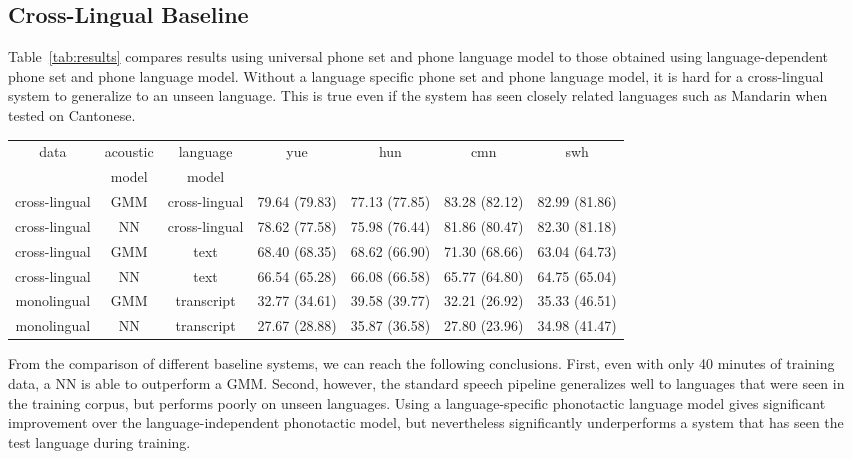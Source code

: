 \subsection{Cross-Lingual Baseline}
\label{s6:mlbaseline}

Table~\ref{tab:results} compares results using universal phone set and
phone language model to those obtained using language-dependent phone
set and phone language model.  Without a language specific phone set
and phone language model, it is hard for a cross-lingual system to
generalize to an unseen language.  This is true even if the system has
seen closely related languages such as Mandarin when tested on
Cantonese.  

\begin{table*}
\begin{center}
\begin{tabular}{|c|c|c|cccc|}
\hline
data & acoustic & language & yue & hun & cmn & swh \\
 & model & model &  & & & \\
\hline
cross-lingual & GMM & cross-lingual & 79.64 (79.83) & 77.13 (77.85) & 83.28 (82.12) & 82.99 (81.86) \\
cross-lingual & NN & cross-lingual & 78.62 (77.58) & 75.98 (76.44) & 81.86 (80.47) & 82.30 (81.18) \\
cross-lingual & GMM & text & 68.40 (68.35) & 68.62 (66.90) & 71.30 (68.66) & 63.04 (64.73) \\
cross-lingual & NN & text & 66.54 (65.28) & 66.08 (66.58) & 65.77 (64.80) & 64.75 (65.04) \\
\hline
monolingual & GMM & transcript & 32.77 (34.61) & 39.58 (39.77) & 32.21 (26.92) & 35.33 (46.51) \\
monolingual & NN & transcript & 27.67 (28.88) & 35.87 (36.58) & 27.80 (23.96) & 34.98 (41.47) \\
\hline
\end{tabular}
\caption{\label{tab:results} PERs of unadapted cross-lingual systems on
  the evaluation sets along with monolingual systems.  PERs on the
  development sets are in parentheses.  Text-based language models are
  trained using phone sequences computed by applying a G2P to
  independent Wikipedia texts in the target language. Transcript-based
  language models are trained using phone sequences computed by
  applying a G2P to native transcripts of the training data.}
\end{center}
\end{table*}

From the comparison of different baseline systems, we can reach the
following conclusions.  First, even with only 40 minutes of
training data, a NN is able to outperform a GMM.  Second,
however, the standard speech pipeline generalizes well to languages
that were seen in the training corpus, but performs poorly on unseen
languages.  Using a language-specific phonotactic language model gives
significant improvement over the language-independent phonotactic
model, but nevertheless significantly underperforms a system that
has seen the test language during training.  

